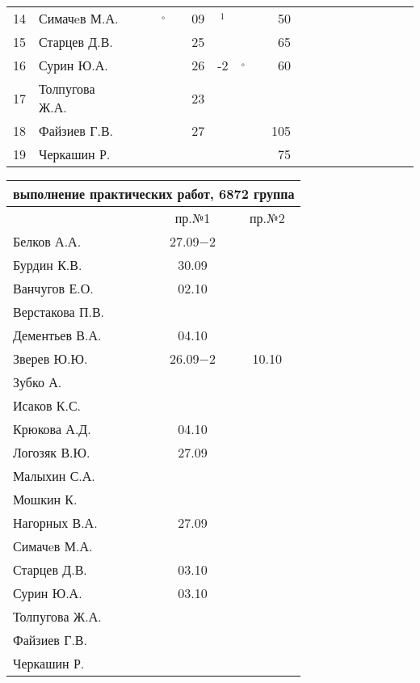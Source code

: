 \documentclass[a4paper,11pt]{article}
\newcommand*\OK{&\small \ding{51}$\!\!_\circ$} %
\newcommand*\ok{&{\small\ding{51}}} %
\newcommand*\no{&{\small }} %
\newcommand*\da{&{\small\ding{48}$\!\!_1$}} %
\begin{document}
\begin{tabular}{l|l|ccccccccrccccccccc}
14& Симачeв М.А.     \ok\ok\OK\ok&09\da\no\no& 50\no&&&&&&&\\
15& Старцев Д.В.     \ok\ok\ok\ok&25\ok\ok\ok& 65\ok&&&&&&&\\
16& Сурин Ю.А.       \ok\ok\ok\ok&26&-2\OK\ok& 60\ok&&&&&&&\\
17& Толпугова Ж.А.   \no\no\no\no&23\ok\no\no \no\no&&&&&&&\\
18& Файзиев Г.В.     \ok\ok\ok\ok&27\ok\ok\ok&105\ok&&&&&&&\\
19& Черкашин Р.      \ok\ok\ok\ok\no\no\no\no& 75\no&&&&&&&\\ 
\bottomrule
\end{tabular} 

\newpage
\begin{tabular}{l|cc}
\multicolumn{3}{c}{выполнение практических работ, 6872 группа} \\
\toprule
& пр.№1 & пр.№2 \\
\midrule
Белков А.А.    &27.09$-2$&     \\   
Бурдин К.В.    &30.09    &     \\
Ванчугов Е.О.  &02.10    &     \\
Верстакова П.В.&         &     \\
Дементьев В.А. &04.10    &     \\
Зверев Ю.Ю.    &26.09$-2$&10.10\\
Зубко А.       &         &     \\
Исаков К.С.    &         &     \\
Крюкова А.Д.   &04.10    &     \\
Логозяк В.Ю.   &27.09    &     \\
Малыхин С.А.   &         &     \\
Мошкин К.      &         &     \\
Нагорных В.А.  &27.09    &     \\
Симачeв М.А.   &         &     \\
Старцев Д.В.   &03.10    &     \\
Сурин Ю.А.     &03.10    &     \\
Толпугова Ж.А. &         &     \\
Файзиев Г.В.   &         &     \\
Черкашин Р.    &         &     \\
\bottomrule
\end{tabular}
\end{document}
